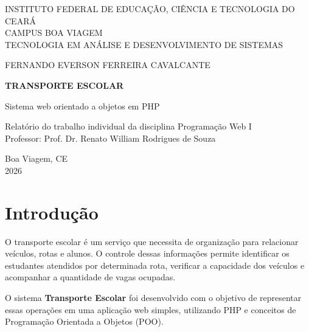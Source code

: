 \documentclass[12pt,a4paper]{article}
\begin{document}
\begin{titlepage}
    \centering

    {\large
    INSTITUTO FEDERAL DE EDUCAÇÃO, CIÊNCIA E TECNOLOGIA DO CEARÁ\\
    CAMPUS BOA VIAGEM\\
    TECNOLOGIA EM ANÁLISE E DESENVOLVIMENTO DE SISTEMAS
    \par}

    \vspace{3cm}

    {\large
    FERNANDO EVERSON FERREIRA CAVALCANTE
    \par}

    \vspace{3cm}

    {\Large\bfseries
    TRANSPORTE ESCOLAR
    \par}

    \vspace{0.5cm}

    {\large
    Sistema web orientado a objetos em PHP
    \par}

    \vfill

    {\large
    Relatório do trabalho individual da disciplina Programação Web I\\
    Professor: Prof. Dr. Renato William Rodrigues de Souza
    \par}

    \vspace{2cm}

    {\large
    Boa Viagem, CE\\
    2026
    \par}
\end{titlepage}

\tableofcontents
\newpage

\section{Introdução}

O transporte escolar é um serviço que necessita de organização para relacionar veículos, rotas e alunos. O controle dessas informações permite identificar os estudantes atendidos por determinada rota, verificar a capacidade dos veículos e acompanhar a quantidade de vagas ocupadas.

O sistema \textbf{Transporte Escolar} foi desenvolvido com o objetivo de representar essas operações em uma aplicação web simples, utilizando PHP e conceitos de Programação Orientada a Objetos (POO).
\end{document}
